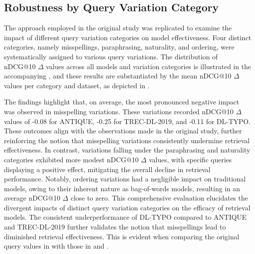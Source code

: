 \begin{comment}
    \subsection{Further Experiments}
    \note{introduce and outline two experiments}
    \note{experiment 1 figure (figure 1) and expl and results and comp}
    
    The study also explored the possibility that unjudged documents were affecting effectiveness calculations. However, the average number of judged documents in the top-10 ranked lists increased for both datasets. This suggests that the performance decline could not be attributed to unjudged documents rising in the rankings due to query variations.
    \note{experiment 2 figure/stats and expl and results and comp}
\end{comment}

\subsection{Robustness by Query Variation Category}
The approach employed in the original study was replicated to examine the impact of different query variation categories on model effectiveness. Four distinct categories, namely misspellings, paraphrasing, naturality, and ordering, were systematically assigned to various query variations. The distribution of nDCG@10 $\Delta$ values across all models and variation categories is illustrated in the accompanying , and these results are substantiated by the mean nDCG@10 $\Delta$ values per category and dataset, as depicted in .




The findings highlight that, on average, the most pronounced negative impact was observed in misspelling variations. These variations recorded nDCG@10 $\Delta$ values of -0.08 for ANTIQUE, -0.25 for TREC-DL-2019, and -0.11 for DL-TYPO. These outcomes align with the observations made in the original study, further reinforcing the notion that misspelling variations consistently undermine retrieval effectiveness. In contrast, variations falling under the paraphrasing and naturality categories exhibited more modest nDCG@10 $\Delta$ values, with specific queries displaying a positive effect, mitigating the overall decline in retrieval performance. Notably, ordering variations had a negligible impact on traditional models, owing to their inherent nature as bag-of-words models, resulting in an average nDCG@10 $\Delta$ close to zero. This comprehensive evaluation elucidates the divergent impacts of distinct query variation categories on the efficacy of retrieval models. The consistent underperformance of DL-TYPO compared to ANTIQUE and TREC-DL-2019 further validates the notion that misspellings lead to diminished retrieval effectiveness. This is evident when comparing the original query values in  with those in  and .


